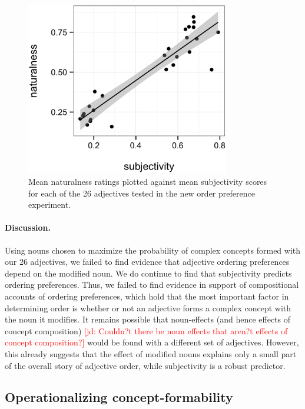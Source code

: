 \documentclass[12pt]{article}
\newcommand{\jd}[1]{\textcolor{red}{[jd: #1]}}
\begin{document}
\renewcommand\thefigure{S.\arabic{figure}}
\begin{figure}
	\centering\includegraphics[width=3.5in]{plots/naturalness-subjectivity-new-nouns.eps}
	\caption{Mean naturalness ratings plotted against mean subjectivity scores for each of the 26 adjectives tested in the new order preference experiment.}\label{fig:subjectivity}
\end{figure}

\paragraph{Discussion.} Using nouns chosen to maximize the probability of complex concepts formed with our 26 adjectives, we failed to find evidence that adjective ordering preferences depend on the modified noun. We do continue to find that subjectivity predicts ordering preferences. Thus, we failed to find evidence in support of compositional accounts of ordering preferences, which hold that the most important factor in determining order is whether or not an adjective forms a complex concept with the noun it modifies. 
It remains possible that noun-effects (and hence effects of concept composition) \jd{Couldn?t there be noun effects that aren?t effects of concept composition?} would be found with a different set of adjectives. 
However, this already suggests that the effect of modified nouns explains only a small part of the overall story of adjective order, while subjectivity is a robust predictor.



\subsection{Operationalizing concept-formability}
\end{document}
